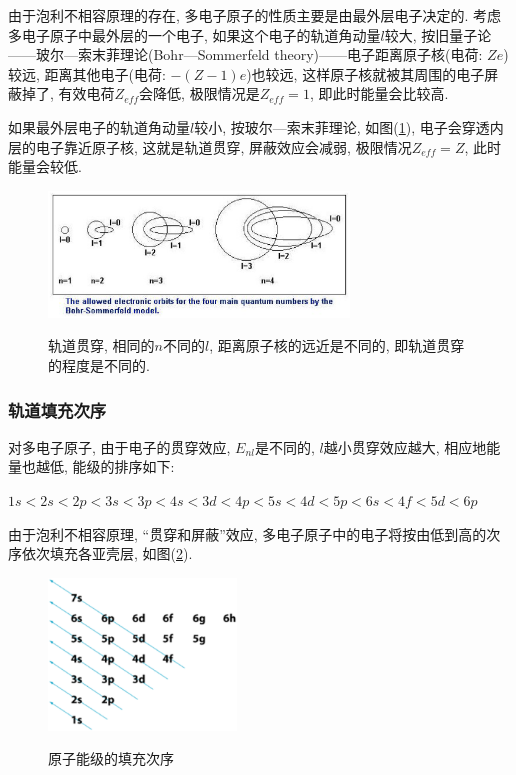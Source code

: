 由于泡利不相容原理的存在, 多电子原子的性质主要是由最外层电子决定的.
考虑多电子原子中最外层的一个电子, 如果这个电子的轨道角动量$l$较大,
按旧量子论——玻尔---索末菲理论(Bohr---Sommerfeld
theory)——电子距离原子核(电荷: $Ze$)较远, 距离其他电子(电荷:
$-(Z-1)e$)也较远, 这样原子核就被其周围的电子屏蔽掉了,
有效电荷$Z_{eff}$会降低, 极限情况是$Z_{eff}=1$, 即此时能量会比较高.


如果最外层电子的轨道角动量$l$较小, 按玻尔---索末菲理论,
如图(\ref{orbital penetration}), 电子会穿透内层的电子靠近原子核,
这就是轨道贯穿, 屏蔽效应会减弱, 极限情况$Z_{eff}=Z$, 此时能量会较低.


\begin{figure}
\begin{center}
  \includegraphics[width=8cm]{Spectrum/bohr-sommerfeld-model.ps}\\
  \caption{轨道贯穿, 相同的$n$不同的$l$, 距离原子核的远近是不同的, 即轨道贯穿的程度是不同的.}\label{orbital penetration}
\end{center}
\end{figure}


\subsubsection*{轨道填充次序}

对多电子原子, 由于电子的贯穿效应, $E_{nl}$是不同的,
$l$越小贯穿效应越大, 相应地能量也越低, 能级的排序如下:

$1s < 2s < 2p < 3s < 3p < 4s < 3d < 4p < 5s < 4d < 5p < 6s < 4f < 5d
< 6p$

由于泡利不相容原理, ``贯穿和屏蔽''效应,
多电子原子中的电子将按由低到高的次序依次填充各亚壳层,
如图(\ref{Shell subshell filling}).

\begin{figure}[h]
\begin{center}
  \includegraphics[width=5cm]{Spectrum/subshell-filling.ps}\\
  \caption{原子能级的填充次序}\label{Shell subshell filling}
\end{center}
\end{figure}

